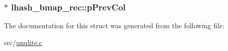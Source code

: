 \hypertarget{structlhash__bmap__rec_a886184e27e3e0e7621dec8b86ff6ee24}{
\subsubsection[{p\-Prev\-Col}]{ $\ast$ lhash\-\_\-bmap\-\_\-rec\-::p\-Prev\-Col}}\label{d8/d06/structlhash__bmap__rec_a886184e27e3e0e7621dec8b86ff6ee24}


The documentation for this struct was generated from the following file\-:\begin{DoxyCompactItemize}
\item 
src/\hyperlink{unqlite_8c}{unqlite.\-c}\end{DoxyCompactItemize}
